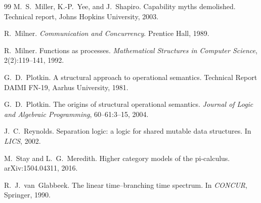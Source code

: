 \documentclass[11pt]{article}
\theoremstyle{definition}
\theoremstyle{plain}
\theoremstyle{remark}
\begin{document}
\begin{thebibliography}{99}
M.~S.~Miller, K.-P.~Yee, and J.~Shapiro.
\newblock Capability myths demolished.
\newblock Technical report, Johns Hopkins University, 2003.

R.~Milner.
\newblock \emph{Communication and Concurrency}.
\newblock Prentice Hall, 1989.

R.~Milner.
\newblock Functions as processes.
\newblock \emph{Mathematical Structures in Computer Science}, 2(2):119--141, 1992.

G.~D.~Plotkin.
\newblock A structural approach to operational semantics.
\newblock Technical Report DAIMI FN-19, Aarhus University, 1981.

G.~D.~Plotkin.
\newblock The origins of structural operational semantics.
\newblock \emph{Journal of Logic and Algebraic Programming}, 60--61:3--15, 2004.

J.~C.~Reynolds.
\newblock Separation logic: a logic for shared mutable data structures.
\newblock In \emph{LICS}, 2002.

M.~Stay and L.~G.~Meredith.
\newblock Higher category models of the pi-calculus.
\newblock arXiv:1504.04311, 2016.

R.~J.~van~Glabbeek.
\newblock The linear time--branching time spectrum.
\newblock In \emph{CONCUR}, Springer, 1990.

\end{thebibliography}
\end{document}
